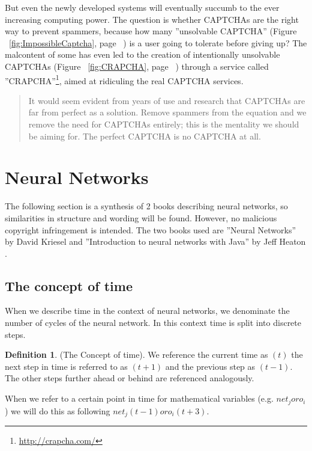 \documentclass[pdftex,a4paper,12pt,twoside]{report}
\theoremstyle{plain} \newtheorem{theorem}{Theorem} \newtheorem{proposition}{Proposition} \newtheorem{lemma}{Lemma} \newtheorem*{corollary}{Corollary}
\theoremstyle{definition} \newtheorem{definition}{Definition} \newtheorem{conjecture}{Conjecture} \newtheorem*{example}{Example} \newtheorem{algorithm}{Algorithm}
\theoremstyle{remark} \newtheorem*{remark}{Remark} \newtheorem*{note}{Note} \newtheorem{case}{Case}
\begin{document}
But even the newly developed systems will eventually succumb to the ever increasing computing power. The question is whether CAPTCHAs are the right way to prevent spammers, because how many ''unsolvable CAPTCHA'' (Figure ~\ref{fig:ImpossibleCaptcha}, page ~\pageref{fig:ImpossibleCaptcha}) is a user going to tolerate before giving up? The malcontent of some has even led to the creation of intentionally unsolvable CAPTCHAs (Figure ~\ref{fig:CRAPCHA}, page ~\pageref{fig:CRAPCHA}) through a service called ''CRAPCHA''\footnote{\url{http://crapcha.com/}}, aimed at ridiculing the real CAPTCHA services.
\begin{quote}
It would seem evident from years of use and research that CAPTCHAs are far from perfect as a solution. Remove spammers from the equation and we remove the need for CAPTCHAs entirely; this is the mentality we should be aiming for. The perfect CAPTCHA is no CAPTCHA at all. \citep{Bushell2011}
\end{quote}\newpage
\section{Neural Networks}
\label{sec:neuralnetworks}
The following section is a synthesis of 2 books describing neural networks, so similarities in structure and wording will be found. However, no malicious copyright infringement is intended. The two books used are ''Neural Networks'' by David Kriesel \citep{Kriesel2013} and ''Introduction to neural networks with Java'' by Jeff Heaton \citep{Heaton2005}.
\subsection{The concept of time}
When we describe time in the context of neural networks, we denominate the number of cycles of the neural network. In this context time is split into discrete steps.
\begin{definition}(The Concept of time). We reference the current time as $(t)$ the next step in time is referred to as $(t+1)$ and the previous step as $(t-1)$. The other steps further ahead or behind are referenced analogously. \end{definition} When we refer to a certain point in time for mathematical variables (e.g. $net_j or o_i$) we will do this as following $net_j(t-1) or o_i(t+3)$.
\end{document}
